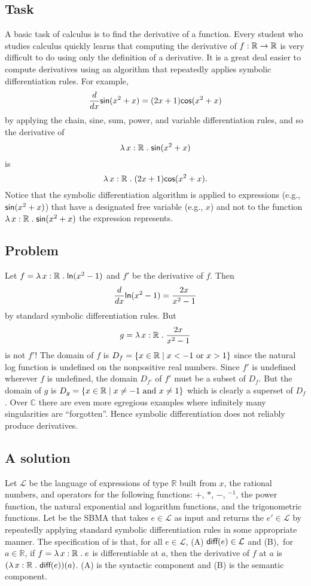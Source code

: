 \documentclass[fleqn]{llncs}
\newcommand{\RR}{\ensuremath{\mathbb{R}}}
\newcommand{\CC}{\ensuremath{\mathbb{C}}}
\newcommand{\Lang}{\ensuremath{\mathcal{L}}}
\begin{document}
\subsection{Task}

A basic task of calculus is to find the derivative of a function.
Every student who studies calculus quickly learns that computing the
derivative of $f : \RR \tarrow \RR$ is very difficult to do using only
the definition of a derivative.  It is a great deal easier to compute
derivatives using an algorithm that repeatedly applies symbolic
differentiation rules.  For example, \[\frac{d}{dx}\mbox{\sf sin}(x^2 +
x) = (2x+1)\mbox{\sf cos}(x^2 + x)\] by applying the chain, sine, sum,
power, and variable differentiation rules, and so the derivative of
\[\LambdaApp x : \RR \mdot \mname{sin}(x^2 + x)\] is \[\LambdaApp x :
\RR \mdot (2x+1)\mname{cos}(x^2 + x).\] Notice that the symbolic
differentiation algorithm is applied to expressions (e.g.,
$\mbox{\sf sin}(x^2 + x)$) that have a designated free variable (e.g.,
$x$) and not to the function $\LambdaApp x : \RR \mdot
\mname{sin}(x^2 + x)$ the expression represents.

\subsection{Problem}

Let $f = \LambdaApp x : \RR \mdot \mname{ln}(x^2 - 1)$ and $f'$ be the
derivative of $f$.  Then \[\frac{d}{dx}\mbox{\sf ln}(x^2 - 1) =
\frac{2x}{x^2-1}\] by standard symbolic differentiation rules.
But \[g = \LambdaApp x : \RR \mdot \frac{2x}{x^2-1}\] is not $f'$!
The domain of $f$ is $D_f = \set{x \in \RR \mid x < -1 \text{ or } x >
  1}$ since the natural log function  is undefined on the
nonpositive real numbers.  Since $f'$ is undefined wherever $f$ is
undefined, the domain $D_{f'}$ of $f'$ must be a subset of $D_f$.  But
the domain of $g$ is $D_g = \set{x \in \RR \mid x \not= -1 \text{ and
} x \not= 1}$ which is clearly a superset of $D_f$. Over $\CC$ there
are even more egregious examples where infinitely many singularities
are ``forgotten''.  Hence symbolic differentiation does not reliably produce
derivatives.

\subsection{A solution}

Let {\Lang} be the language of expressions of type $\RR$ built from
$x$, the rational numbers, and operators for the following functions:
$+$, $*$, $-$, $\phantom{}^{-1}$, the power function, the natural
exponential and logarithm functions, and the trigonometric functions.
Let  be the SBMA that takes $e \in \Lang$ as input and
returns the $e' \in \Lang$ by repeatedly applying standard symbolic
differentiation rules in some appropriate manner.  The specification
of  is that, for all $e \in \Lang$, (A) $\mname{diff}(e)
\in \Lang$ and (B),~for $a \in \RR$, if $f = \LambdaApp x : \RR \mdot
e$ is differentiable at $a$, then the derivative of $f$ at $a$ is
$(\LambdaApp x : \RR \mdot \mname{diff}(e))(a)$.  (A) is the syntactic
component and (B) is the semantic component.
\end{document}
